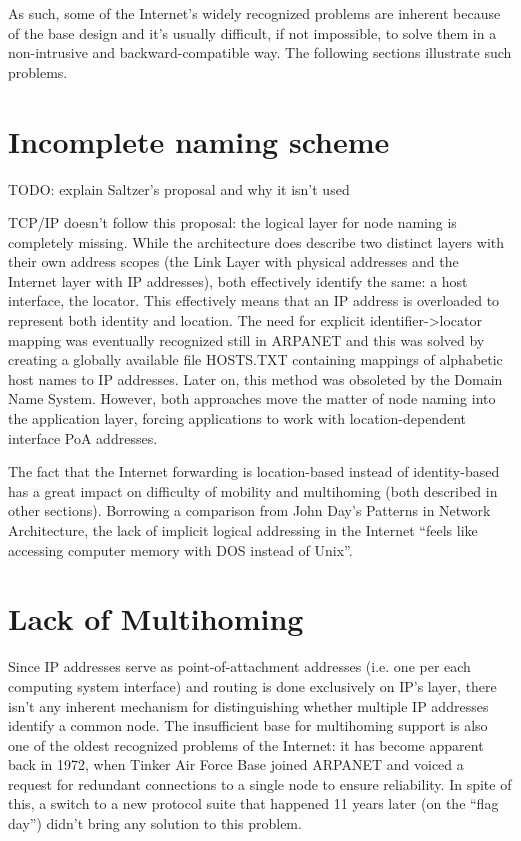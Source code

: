     As such, some of the Internet's widely recognized problems are inherent because of the base design and it's usually difficult, if not impossible, to solve them in a non-intrusive and backward-compatible way. The following sections illustrate such problems.

    \section{Incomplete naming scheme}

        TODO: explain Saltzer's proposal and why it isn't used

        TCP/IP doesn't follow this proposal: the logical layer for node naming is completely missing. While the architecture does describe two distinct layers with their own address scopes (the Link Layer with physical addresses and the Internet layer with IP addresses), both effectively identify the same: a host interface, the locator. This effectively means that an IP address is overloaded to represent both identity and location. The need for explicit identifier->locator mapping was eventually recognized still in ARPANET and this was solved by creating a globally available file HOSTS.TXT containing mappings of alphabetic host names to IP addresses. Later on, this method was obsoleted by the Domain Name System. However, both approaches move the matter of node naming into the application layer, forcing applications to work with location-dependent interface PoA addresses.

        The fact that the Internet forwarding is location-based instead of identity-based has a great impact on difficulty of mobility and multihoming (both described in other sections). Borrowing a comparison from John Day's Patterns in Network Architecture, the lack of implicit logical addressing in the Internet ``feels like accessing computer memory with DOS instead of Unix''.

    \section{Lack of Multihoming}

        Since IP addresses serve as point-of-attachment addresses (i.e. one per each computing system interface) and routing is done exclusively on IP's layer, there isn't any inherent mechanism for distinguishing whether multiple IP addresses identify a common node. The insufficient base for multihoming support is also one of the oldest recognized problems of the Internet: it has become apparent back in 1972, when Tinker Air Force Base joined ARPANET and voiced a request for redundant connections to a single node to ensure reliability. In spite of this, a switch to a new protocol suite that happened 11 years later (on the ``flag day'') didn't bring any solution to this problem.

